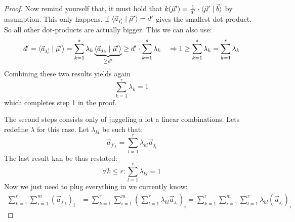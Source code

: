 \begin{proof}
    Now remind yourself that, it must hold that $k(\vec \mu') = \frac{1}{d'}\cdot\langle \vec{\mu}' \mid \vec b \rangle$ by assumption. This only happens, if $\langle \vec a_{j'_l} \mid \vec\mu' \rangle = d'$ gives the smallest dot-product. So all other dot-products are actually bigger. This we can also use:
    $$d' = \langle \vec a_{j'_l} \mid \vec\mu' \rangle = \sum_{k=1}^{s}\lambda_k\underbrace{\langle \vec a_{j_k} \mid \vec\mu' \rangle}_{\geq d'} \geq d'\cdot \sum_{k=1}^{s}\lambda_k \quad\Rightarrow 1 \geq \sum_{k=1}^{s}\lambda_k = \sum_{k=1}^{r}\lambda_k$$
    Combining these two results yields again
    $$\sum_{k=1}^{r}\lambda_k = 1$$
    which completes step 1 in the proof.

    The second steps consists only of juggeling a lot a linear combinations. Lets redefine $\lambda$ for this case. Let $\lambda_{kl}$ be such that:
    $$\vec a_{j'_k} = \sum_{l=1}^{r}\lambda_{kl}\vec a_{j_l}$$
    The last result kan be thus restated:
    $$\forall k \leq r\colon\sum_{l=1}^{r}\lambda_{kl} = 1$$
    Now we just need to plug everything in we currently know:
    \begin{align*}
        \sum_{k=1}^{r}\sum_{i=1}^{m}(\vec a_{j'_k})_i &= \sum_{k=1}^{r}\sum_{i=1}^{m}\left(\sum_{l=1}^{r}\lambda_{kl}\vec a_{j_l}\right)_i = \sum_{k=1}^{r}\sum_{i=1}^{m}\sum_{l=1}^{r}\lambda_{kl}\left(\vec a_{j_l}\right)_i
    \end{align*}
\end{proof}



